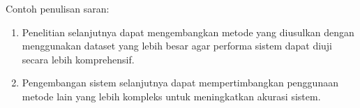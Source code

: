 Contoh penulisan saran:

\begin{enumerate}

\item Penelitian selanjutnya dapat mengembangkan metode yang diusulkan
dengan menggunakan dataset yang lebih besar agar performa sistem
dapat diuji secara lebih komprehensif.

\item Pengembangan sistem selanjutnya dapat mempertimbangkan
penggunaan metode lain yang lebih kompleks untuk meningkatkan
akurasi sistem.

\end{enumerate}